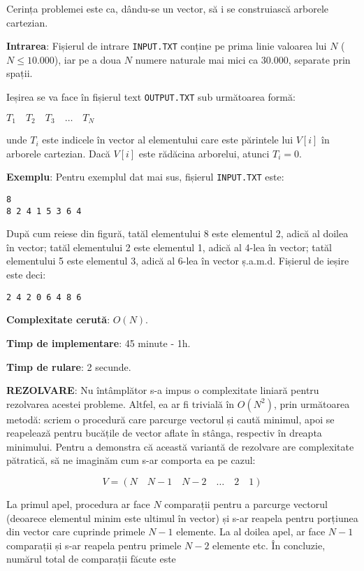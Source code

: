 Cerința problemei este ca, dându-se un vector, să i se construiască arborele
cartezian.

{\bf Intrarea}: Fișierul de intrare {\tt INPUT.TXT} conține pe prima linie
valoarea lui $N$ ($N \leq 10.000$), iar pe a doua $N$ numere naturale mai mici
ca 30.000, separate prin spații.

Ieșirea se va face în fișierul text {\tt OUTPUT.TXT} sub următoarea formă:

$T_1 \quad T_2 \quad T_3 \quad \dots \quad T_N$

unde $T_i$ este indicele în vector al elementului care este părintele lui
$V[i]$ în arborele cartezian. Dacă $V[i]$ este rădăcina arborelui, atunci $T_i
= 0$.

{\bf Exemplu}: Pentru exemplul dat mai sus, fișierul {\tt INPUT.TXT} este:

\begin{verbatim}
8
8 2 4 1 5 3 6 4
\end{verbatim}

După cum reiese din figură, tatăl elementului 8 este elementul 2, adică al
doilea în vector; tatăl elementului 2 este elementul 1, adică al 4-lea în
vector; tatăl elementului 5 este elementul 3, adică al 6-lea în vector
ș.a.m.d. Fișierul de ieșire este deci:

\begin{verbatim}
2 4 2 0 6 4 8 6
\end{verbatim}

{\bf Complexitate cerută}: $O(N)$.

{\bf Timp de implementare}: 45 minute - 1h.

{\bf Timp de rulare}: 2 secunde.

{\bf REZOLVARE}: Nu întâmplător s-a impus o complexitate liniară pentru
rezolvarea acestei probleme. Altfel, ea ar fi trivială în $O(N^2)$, prin
următoarea metodă: scriem o procedură care parcurge vectorul și caută minimul,
apoi se reapelează pentru bucățile de vector aflate în stânga, respectiv în
dreapta minimului. Pentru a demonstra că această variantă de rezolvare are
complexitate pătratică, să ne imaginăm cum s-ar comporta ea pe cazul:

\begin{equation}
  V = (N \quad N-1 \quad N-2 \quad \dots \quad 2 \quad 1)
\end{equation}

La primul apel, procedura ar face $N$ comparații pentru a parcurge vectorul
(deoarece elementul minim este ultimul în vector) și s-ar reapela pentru
porțiunea din vector care cuprinde primele $N-1$ elemente. La al doilea apel,
ar face $N-1$ comparații și s-ar reapela pentru primele $N-2$ elemente etc. În
concluzie, numărul total de comparații făcute este

